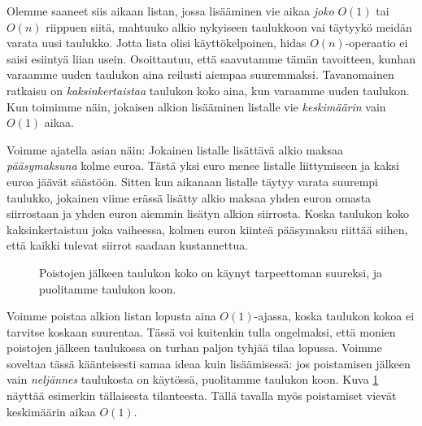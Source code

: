 Olemme saaneet siis aikaan listan, jossa lisääminen
vie aikaa \emph{joko} $O(1)$ tai $O(n)$ riippuen siitä,
mahtuuko alkio nykyiseen taulukkoon vai täytyykö
meidän varata uusi taulukko.
Jotta lista olisi käyttökelpoinen, hidas $O(n)$-operaatio
ei saisi esiintyä liian usein.
Osoittautuu, että saavutamme tämän tavoitteen,
kunhan varaamme uuden taulukon aina reilusti aiempaa suuremmaksi.
Tavanomainen ratkaisu on \emph{kaksinkertaistaa} taulukon koko aina,
kun varaamme uuden taulukon.
Kun toimimme näin, jokaisen alkion lisääminen listalle vie
\emph{keskimäärin} vain $O(1)$ aikaa.

Voimme ajatella asian näin: Jokainen listalle lisättävä alkio
maksaa \emph{pääsy\-maksuna} kolme euroa.
Tästä yksi euro menee listalle liittymiseen ja kaksi euroa jäävät säästöön.
Sitten kun aikanaan listalle täytyy varata suurempi taulukko,
jokainen viime erässä lisätty alkio maksaa yhden euron omasta siirrostaan
ja yhden euron aiemmin lisätyn alkion siirrosta.
Koska taulukon koko kaksinkertaistuu joka vaiheessa,
kolmen euron kiinteä pääsymaksu riittää siihen, että kaikki tulevat
siirrot saadaan kustannettua.

\begin{figure}
\center
{}
\caption{Poistojen jälkeen taulukon koko on käynyt tarpeettoman suureksi,
ja puolitamme taulukon koon.}                                                                        
\label{fig:lispoi}
\end{figure}

Voimme poistaa alkion listan lopusta aina $O(1)$-ajassa,
koska taulukon kokoa ei tarvitse koskaan suurentaa.
Tässä voi kuitenkin tulla ongelmaksi, että monien poistojen
jälkeen taulukossa on turhan paljon tyhjää tilaa lopussa.
Voimme soveltaa tässä käänteisesti samaa ideaa kuin lisäämisessä:
jos poistamisen jälkeen vain \emph{neljännes} taulukosta on käytössä,
puolitamme taulukon koon.
Kuva \ref{fig:lispoi} näyttää esimerkin tällaisesta tilanteesta.
Tällä tavalla myös poistamiset vievät keskimäärin aikaa $O(1)$.

